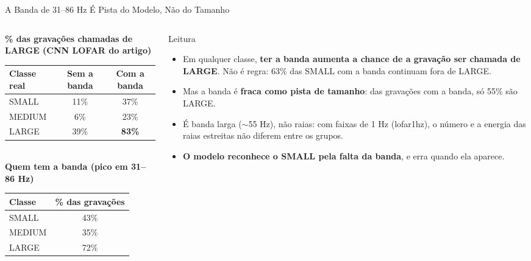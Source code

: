 \documentclass[aspectratio=169]{beamer}
\newcommand{\cahi}[1]{\cellcolor{green!30}\textbf{#1}}
\newcommand{\calo}[1]{\cellcolor{red!20}#1}
\begin{document}
\begin{frame}{A Banda de 31--86 Hz É Pista do Modelo, Não do Tamanho}
    \footnotesize
    \begin{columns}[T]
        \begin{column}{0.48\textwidth}
            \centering
            \scriptsize
            \textbf{\% das gravações chamadas de LARGE (CNN LOFAR do artigo)}\\[3pt]
            \begin{tabular}{@{}lcc@{}}
                \toprule
                Classe real & Sem a banda & Com a banda \\
                \midrule
                SMALL & 11\% & \calo{37\%} \\
                MEDIUM & 6\% & 23\% \\
                LARGE & 39\% & \cahi{83\%} \\
                \bottomrule
            \end{tabular}\\[6pt]
            \textbf{Quem tem a banda (pico em 31--86 Hz)}\\[3pt]
            \begin{tabular}{@{}lc@{}}
                \toprule
                Classe & \% das gravações \\
                \midrule
                SMALL & 43\% \\
                MEDIUM & 35\% \\
                LARGE & 72\% \\
                \bottomrule
            \end{tabular}
        \end{column}
        \begin{column}{0.50\textwidth}
            \begin{block}{\small Leitura}
                \scriptsize
                \begin{itemize}
                    \setlength{\itemsep}{2pt}
                    \item Em qualquer classe, \textbf{ter a banda aumenta a chance de a gravação ser chamada de LARGE}. Não é regra: 63\% das SMALL com a banda continuam fora de LARGE.
                    \item Mas a banda é \textbf{fraca como pista de tamanho}: das gravações com a banda, só 55\% são LARGE.
                    \item É banda larga ($\sim$55 Hz), não raias: com faixas de 1 Hz (lofar1hz), o número e a energia das raias estreitas não diferem entre os grupos.
                    \item \textbf{O modelo reconhece o SMALL pela falta da banda}, e erra quando ela aparece.
                \end{itemize}
            \end{block}
        \end{column}
    \end{columns}
\end{frame}
\end{document}
